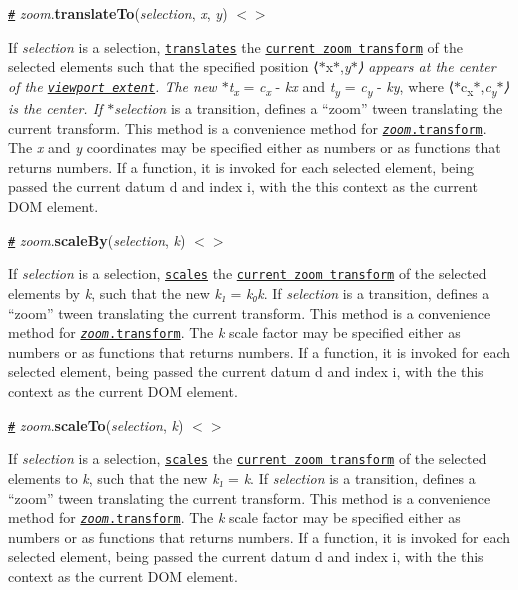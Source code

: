 \href{#zoom_translateTo}{\tt \#} {\itshape zoom}.{\bfseries translate\+To}({\itshape selection}, {\itshape x}, {\itshape y}) \href{https://github.com/d3/d3-zoom/blob/master/src/zoom.js#L119}{\tt $<$$>$}

If {\itshape selection} is a selection, \href{#transform_translate}{\tt translates} the \href{#zoomTransform}{\tt current zoom transform} of the selected elements such that the specified position ⟨$\ast$x$\ast$,{\itshape y$\ast$⟩ appears at the center of the \href{#zoom_extent}{\tt viewport extent}. The new $\ast$t\textsubscript{x}} = {\itshape c\textsubscript{x}} -\/ {\itshape kx} and {\itshape t\textsubscript{y}} = {\itshape c\textsubscript{y}} -\/ {\itshape ky}, where ⟨$\ast$c\textsubscript{x}$\ast$,{\itshape c\textsubscript{y}$\ast$⟩ is the center. If $\ast$selection} is a transition, defines a “zoom” tween translating the current transform. This method is a convenience method for \href{#zoom_transform}{\tt {\itshape zoom}.transform}. The {\itshape x} and {\itshape y} coordinates may be specified either as numbers or as functions that returns numbers. If a function, it is invoked for each selected element, being passed the current datum {\ttfamily d} and index {\ttfamily i}, with the {\ttfamily this} context as the current D\+OM element.

\href{#zoom_scaleBy}{\tt \#} {\itshape zoom}.{\bfseries scale\+By}({\itshape selection}, {\itshape k}) \href{https://github.com/d3/d3-zoom/blob/master/src/zoom.js#L91}{\tt $<$$>$}

If {\itshape selection} is a selection, \href{#transform_scale}{\tt scales} the \href{#zoomTransform}{\tt current zoom transform} of the selected elements by {\itshape k}, such that the new {\itshape k₁} = {\itshape k₀k}. If {\itshape selection} is a transition, defines a “zoom” tween translating the current transform. This method is a convenience method for \href{#zoom_transform}{\tt {\itshape zoom}.transform}. The {\itshape k} scale factor may be specified either as numbers or as functions that returns numbers. If a function, it is invoked for each selected element, being passed the current datum {\ttfamily d} and index {\ttfamily i}, with the {\ttfamily this} context as the current D\+OM element.

\href{#zoom_scaleTo}{\tt \#} {\itshape zoom}.{\bfseries scale\+To}({\itshape selection}, {\itshape k}) \href{https://github.com/d3/d3-zoom/blob/master/src/zoom.js#L99}{\tt $<$$>$}

If {\itshape selection} is a selection, \href{#transform_scale}{\tt scales} the \href{#zoomTransform}{\tt current zoom transform} of the selected elements to {\itshape k}, such that the new {\itshape k₁} = {\itshape k}. If {\itshape selection} is a transition, defines a “zoom” tween translating the current transform. This method is a convenience method for \href{#zoom_transform}{\tt {\itshape zoom}.transform}. The {\itshape k} scale factor may be specified either as numbers or as functions that returns numbers. If a function, it is invoked for each selected element, being passed the current datum {\ttfamily d} and index {\ttfamily i}, with the {\ttfamily this} context as the current D\+OM element.

